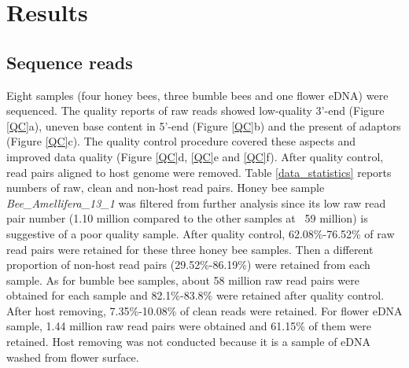 \documentclass[11pt]{article}
\begin{document}
  \section{Results}

    \subsection{Sequence reads}
    Eight samples (four honey bees, three bumble bees and one flower eDNA) were sequenced. 
    The quality reports of raw reads showed low-quality 3'-end (Figure \ref{QC}a), uneven base content in 5'-end (Figure \ref{QC}b) and the present of adaptors (Figure \ref{QC}c). 
    The quality control procedure covered these aspects and improved data quality (Figure \ref{QC}d, \ref{QC}e and \ref{QC}f).
    \newline
    After quality control, read pairs aligned to host genome were removed. 
    Table \ref{data_statistics} reports numbers of raw, clean and non-host read pairs. 
    Honey bee sample \textit{Bee\_Amellifera\_13\_1} was filtered from further analysis since its low raw read pair number (1.10 million compared to the other samples at ~59 million) is suggestive of a poor quality sample.  
    After quality control, 62.08\%-76.52\% of raw read pairs were retained for these three honey bee samples. 
    Then a different proportion of non-host read pairs (29.52\%-86.19\%) were retained from each sample. 
    As for bumble bee samples, about 58 million raw read pairs were obtained for each sample and 82.1\%-83.8\% were retained after quality control. 
    After host removing, 7.35\%-10.08\% of clean reads were retained.  
    For flower eDNA sample, 1.44 million raw read pairs were obtained and 61.15\% of them were retained. 
    Host removing was not conducted because it is a sample of eDNA washed from flower surface. 

\end{document}
